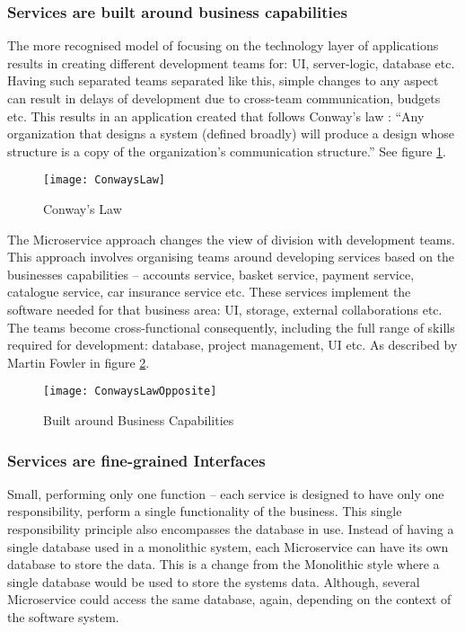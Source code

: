 \subsubsection{Services are built around business capabilities}
The more recognised model of focusing on the technology layer of applications results in creating different development teams for: UI, server-logic, database etc. Having such separated teams separated like this, simple changes to any aspect can result in delays of development due to cross-team communication, budgets etc. This results in an application created that follows Conway’s law \cite{ConwayLaw}: “Any organization that designs a system (defined broadly) will produce a design whose structure is a copy of the organization's communication structure.” See figure \ref{fig:CowayLaw}.
\begin{figure}[h]
	\caption{Conway's Law}
	\label{fig:CowayLaw}
	\texttt{[image: ConwaysLaw]}
	\centering
\end{figure}
The Microservice approach changes the view of division with development teams. This approach involves organising teams around developing services based on the businesses capabilities – accounts service, basket service, payment service, catalogue service, car insurance service etc. These services implement the software needed for that business area: UI, storage, external collaborations etc. The teams become cross-functional consequently, including the full range of skills required for development: database, project management, UI etc. As described by Martin Fowler \cite{MartinFowlersite} in figure \ref{fig:busCapa}. 
\begin{figure}[h]
	\caption{Built around Business Capabilities}
	\label{fig:busCapa}
	\texttt{[image: ConwaysLawOpposite]}
	\centering
\end{figure}

\subsubsection{Services are fine-grained Interfaces}
Small, performing only one function – each service is designed to have only one responsibility, perform a single functionality of the business. This single responsibility principle also encompasses the database in use. Instead of having a single database used in a monolithic system, each Microservice can have its own database to store the data. This is a change from the Monolithic style where a single database would be used to store the systems data. Although, several Microservice could access the same database, again, depending on the context of the software system.

